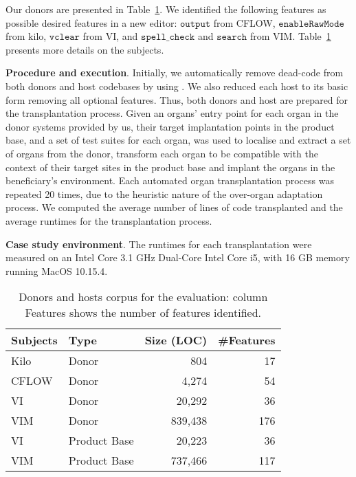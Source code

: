 Our donors are presented in Table~\ref{tab:donors_list}.
We identified the following features as possible desired features in a new editor: $\texttt{output}$ from CFLOW, $\texttt{enableRawMode}$ from kilo, $\texttt{vclear}$ from VI, and $\texttt{spell\_check}$ and $\texttt{search}$ from VIM. Table~\ref{tab:donors_list} presents more details on the subjects.

\textbf{Procedure and execution}. 
Initially, we automatically remove dead-code from both donors and host codebases by using \prodscalpel. 
We also reduced each host to its basic form removing all optional features. Thus, both donors and host are prepared for the transplantation process. 
Given an organs' entry point for each organ in the donor systems provided by us, their target implantation points in the product base, and a set of test suites for each organ, \prodscalpel was used to localise and extract a set of organs from the donor, transform each organ to be compatible with the context of their target sites in the product base and implant the organs in the beneficiary's environment. Each automated organ transplantation process was repeated 20 times, due to the heuristic nature of the over-organ adaptation process. We computed the average number of lines of code transplanted and the average runtimes for the transplantation process.

\textbf{Case study environment}. The runtimes for each transplantation were measured on an Intel Core 3.1 GHz Dual-Core Intel Core i5, with 16 GB memory running MacOS 10.15.4.

\begin{table}[t]
\centering 
	\caption{Donors and hosts corpus for the evaluation: column Features shows the number of features identified. 
	}
	\label{tab:donors_list}
	\begin{tabular}{llrr} \hline
        Subjects &Type  & Size (LOC) & \#Features   \\\hline
	    Kilo     &Donor & 804        & 17      \\
		CFLOW    &Donor & 4,274      & 54      \\
		VI       &Donor & 20,292     & 36      \\
		VIM      &Donor & 839,438    & 176      \\\hline
		VI       &Product Base & 20,223 & 36      \\
		VIM      &Product Base & 737,466 & 117     \\\hline
	\end{tabular}
\end{table}

